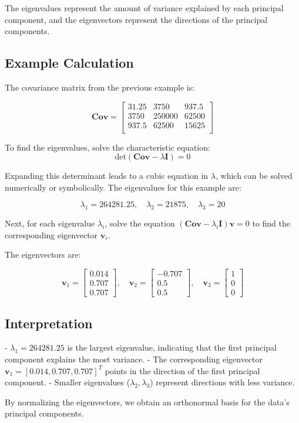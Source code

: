 \documentclass{article}
\begin{document}
The eigenvalues represent the amount of variance explained by each principal component, and the eigenvectors represent the directions of the principal components.

\subsection*{Example Calculation}

The covariance matrix from the previous example is:

\[
\mathbf{Cov} = 
\begin{bmatrix}
31.25 & 3750 & 937.5 \\
3750 & 250000 & 62500 \\
937.5 & 62500 & 15625 \\
\end{bmatrix}
\]

To find the eigenvalues, solve the characteristic equation:
\[
\text{det}(\mathbf{Cov} - \lambda \mathbf{I}) = 0
\]

Expanding this determinant leads to a cubic equation in \(\lambda\), which can be solved numerically or symbolically. The eigenvalues for this example are:

\[
\lambda_1 = 264281.25, \quad \lambda_2 = 21875, \quad \lambda_3 = 20
\]

Next, for each eigenvalue \(\lambda_i\), solve the equation \((\mathbf{Cov} - \lambda_i \mathbf{I}) \mathbf{v} = 0\) to find the corresponding eigenvector \(\mathbf{v}_i\).

The eigenvectors are:

\[
\mathbf{v}_1 = 
\begin{bmatrix}
0.014 \\
0.707 \\
0.707
\end{bmatrix}, \quad
\mathbf{v}_2 = 
\begin{bmatrix}
-0.707 \\
0.5 \\
0.5
\end{bmatrix}, \quad
\mathbf{v}_3 = 
\begin{bmatrix}
1 \\
0 \\
0
\end{bmatrix}
\]

\subsection*{Interpretation}

- \(\lambda_1 = 264281.25\) is the largest eigenvalue, indicating that the first principal component explains the most variance.
- The corresponding eigenvector \(\mathbf{v}_1 = [0.014, 0.707, 0.707]^T\) points in the direction of the first principal component.
- Smaller eigenvalues (\(\lambda_2, \lambda_3\)) represent directions with less variance.

By normalizing the eigenvectors, we obtain an orthonormal basis for the data's principal components.
\end{document}
